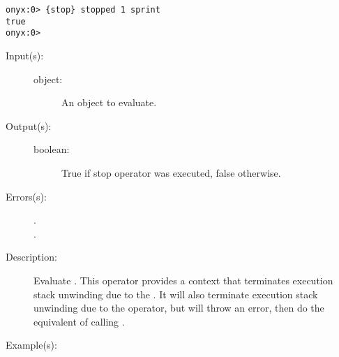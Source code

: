 \begin{description}
\begin{description}
\begin{verbatim}
onyx:0> {stop} stopped 1 sprint
true
onyx:0>
		\end{verbatim}
	\end{description}
\label{systemdict:stopped}
\item[{\onyxop{object}{stopped}{boolean}}: ]
	\begin{description}\item[]
	\item[Input(s): ]
		\begin{description}\item[]
		\item[object: ]
			An object to evaluate.
		\end{description}
	\item[Output(s): ]
		\begin{description}\item[]
		\item[boolean: ]
			True if stop operator was executed, false otherwise.
		\end{description}
	\item[Errors(s): ]
		\begin{description}\item[]
		\item[.]
		\item[.]
		\end{description}
	\item[Description: ]
		Evaluate .  This operator provides a context that
		terminates execution stack unwinding due to the
		.  It will also
		terminate execution stack unwinding due to the 
		 operator, but will
		throw an  error, then do the
		equivalent of calling
		.
	\item[Example(s): ]\begin{verbatim}


\end{verbatim}
\end{description}
\end{description}

